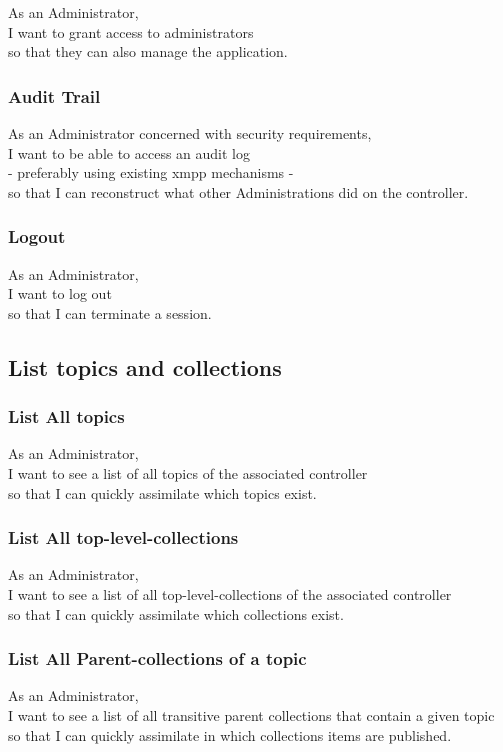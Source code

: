 As an Administrator,\\
I want to grant access to administrators \\
so that they can also manage the application.

\subsubsection{Audit Trail}\label{sec:requirement-audit-trail}

As an Administrator concerned with security requirements,\\
I want to be able to access an audit log\\
- preferably using existing \gls{xmpp} mechanisms - \\
so that I can reconstruct what other Administrations did on the controller.

\subsubsection{Logout}\label{sec:requirement-logout}

As an Administrator,\\
I want to log out\\
so that I can terminate a session.

\subsection{List topics and collections}\label{sec:list-topics}

\subsubsection{List All topics}\label{sec:requirement-list-all-topics}
As an Administrator,\\
I want to see a list of all topics of the associated controller\\
so that I can quickly assimilate which topics exist.

\subsubsection{List All top-level-collections}
As an Administrator,\\
I want to see a list of all top-level-collections of the associated controller\\
so that I can quickly assimilate which collections exist.

\subsubsection{List All Parent-collections of a topic}
As an Administrator,\\
I want to see a list of all transitive parent collections that contain a given topic\\
so that I can quickly assimilate in which collections items are published.


